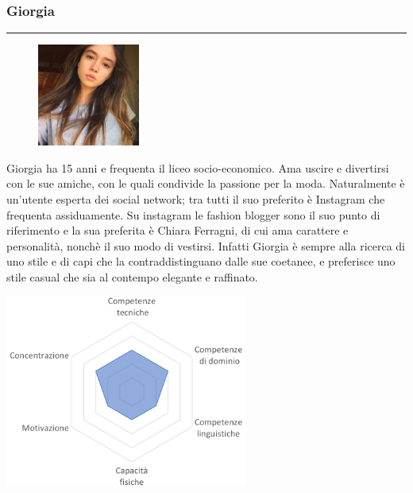 \documentclass[12pt,a4paper]{report}
\begin{document}
\subsubsection{Giorgia}
\rule{\textwidth}{0.5pt}
\begin{figure}
  \centering
    \includegraphics[width=0.3\textwidth]{"Images Latex/Personas/Giorgia"}
\end{figure}
  Giorgia ha 15 anni e frequenta il liceo socio-economico. Ama uscire e divertirsi con le sue amiche, con le quali condivide la passione per la moda. Naturalmente è un'utente esperta dei social network; tra tutti il suo preferito è Instagram che frequenta assiduamente. Su instagram le fashion blogger sono il suo punto di riferimento e la sua preferita è Chiara Ferragni, di cui ama carattere e personalità, nonchè il suo modo di vestirsi. Infatti Giorgia è sempre alla ricerca di uno stile e di capi che la contraddistinguano dalle sue coetanee, e preferisce uno stile casual che sia al contempo elegante e raffinato.\\
  \begin{center}
    \includegraphics[width=0.6\textwidth]{"Images Latex/Personas/Giorgia15"}
  \end{center}
\newpage
\end{document}

